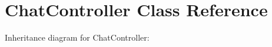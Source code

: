 \hypertarget{classChatController}{}\section{Chat\+Controller Class Reference}
\label{classChatController}


Inheritance diagram for Chat\+Controller\+:
